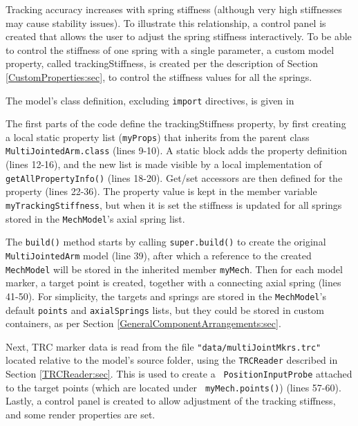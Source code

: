 Tracking accuracy increases with spring stiffness (although very high
stiffnesses may cause stability issues). To illustrate this relationship, a
control panel is created that allows the user to adjust the spring stiffness
interactively. To be able to control the stiffness of one spring with a single
parameter, a custom model property, called {\sf trackingStiffness}, is created
per the description of Section \ref{CustomProperties:sec}, to control the
stiffness values for all the springs.

The model's class definition, excluding {\tt import} directives, is given in
%
\lstset{numbers=left}
\iflatexml

\else

\fi
\lstset{numbers=none}
%
The first parts of the code define the {\sf trackingStiffness} property, by
first creating a local static property list ({\tt myProps}) that inherits from
the parent class {\tt MultiJointedArm.class} (lines 9-10). A static block adds
the property definition (lines 12-16), and the new list is made visible by a
local implementation of {\tt getAllPropertyInfo()} (lines 18-20).  Get/set
accessors are then defined for the property (lines 22-36). The property value
is kept in the member variable {\tt myTrackingStiffness}, but when it is set
the stiffness is updated for all springs stored in the {\tt MechModel}'s axial
spring list.

The {\tt build()} method starts by calling {\tt super.build()} to create the
original {\tt MultiJointedArm} model (line 39), after which a reference to the
created {\tt MechModel} will be stored in the inherited member {\tt myMech}.
Then for each model marker, a target point is created, together with a
connecting axial spring (lines 41-50). For simplicity, the targets and springs
are stored in the {\tt MechModel}'s default {\tt points} and {\tt axialSprings}
lists, but they could be stored in custom containers, as per
Section \ref{GeneralComponentArrangements:sec}.

Next, TRC marker data is read from the file {\tt "data/multiJointMkrs.trc"}
located relative to the model's source folder, using the {\tt TRCReader}
described in Section \ref{TRCReader:sec}. This is used to create a {\tt
PositionInputProbe} attached to the target points (which are located under {\tt
myMech.points()}) (lines 57-60). Lastly, a control panel is created to allow
adjustment of the tracking stiffness, and some render properties are set.

